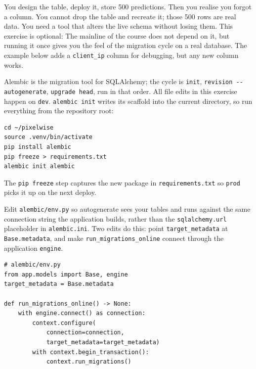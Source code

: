 You design the table, deploy it, store 500 predictions. Then you realise
you forgot a column. You cannot drop the table and recreate it; those 500
rows are real data. You need a tool that alters the live schema without
losing them. This exercise is optional: The mainline of the course does
not depend on it, but running it once gives you the feel of the migration
cycle on a real database. The example below adds a \texttt{client\_ip}
column for debugging, but any new column works.


Alembic is the migration tool for SQLAlchemy; the cycle is \texttt{init},
\texttt{revision -{}-autogenerate}, \texttt{upgrade head}, run in that
order. All file edits in this exercise happen on \texttt{dev}.
\texttt{alembic init} writes its scaffold into the current directory, so
run everything from the repository root:

\begin{verbatim}
cd ~/pixelwise
source .venv/bin/activate
pip install alembic
pip freeze > requirements.txt
alembic init alembic
\end{verbatim}

The \texttt{pip freeze} step captures the new package in
\texttt{requirements.txt} so \texttt{prod} picks it up on the next
deploy.

Edit \texttt{alembic/env.py} so autogenerate sees your tables and runs
against the same connection string the application builds, rather than the
\texttt{sqlalchemy.url} placeholder in \texttt{alembic.ini}. Two edits do
this: point \texttt{target\_metadata} at \texttt{Base.metadata}, and make
\texttt{run\_migrations\_online} connect through the application
\texttt{engine}.

\begin{verbatim}
# alembic/env.py
from app.models import Base, engine
target_metadata = Base.metadata

def run_migrations_online() -> None:
    with engine.connect() as connection:
        context.configure(
            connection=connection,
            target_metadata=target_metadata)
        with context.begin_transaction():
            context.run_migrations()
\end{verbatim}

